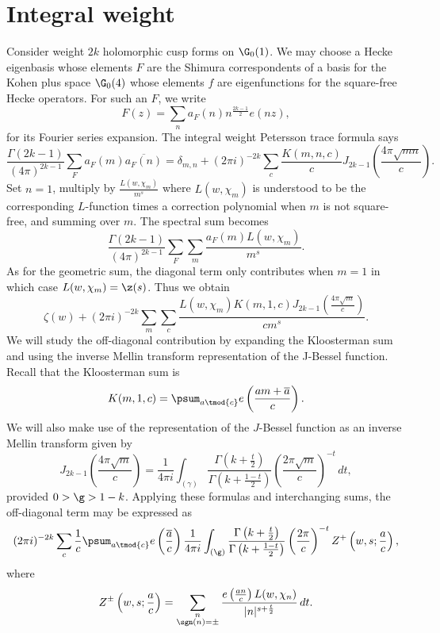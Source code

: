 \documentclass[12pt]{article}
\begin{document}
\section{Integral weight}
    Consider weight \(2k\) holomorphic cusp forms on \(\G_{0}(1)\). We may choose a Hecke eigenbasis whose elements \(F\) are the Shimura correspondents of a basis for the Kohen plus space \(\G_{0}(4)\) whose elements \(f\) are eigenfunctions for the square-free Hecke operators. For such an \(F\), we write
    \[
      F(z) = \sum_{n}a_{F}(n)n^{\frac{2k-1}{2}}e(nz),
    \]
    for its Fourier series expansion. The integral weight Petersson trace formula says
    \[
      \frac{\Gamma(2k-1)}{(4\pi)^{2k-1}}\sum_{F}a_{F}(m)\overline{a_{F}(n)}=\delta_{m,n}+(2\pi i)^{-2k}\sum_{c}\frac{K(m,n,c)}{c}J_{2k-1}\left(\frac{4\pi \sqrt{mn}}{c}\right).
    \]
    Set \(n = 1\), multiply by \(\frac{L(w,\chi_{m})}{m^s}\) where \(L(w,\chi_{m})\) is understood to be the corresponding \(L\)-function times a correction polynomial when \(m\) is not square-free, and summing over \(m\). The spectral sum becomes
    \[
      \frac{\Gamma(2k-1)}{(4\pi)^{2k-1}}\sum_{F}\sum_{m}\frac{a_{F}(m)L(w,\chi_{m})}{m^{s}}.
    \]
    As for the geometric sum, the diagonal term only contributes when \(m = 1\) in which case \(L(w,\chi_{m}) = \z(s)\). Thus we obtain
    \[
      \zeta(w)+(2\pi i)^{-2k}\sum_{m}\sum_{c}\frac{L(w,\chi_{m})K(m,1,c)J_{2k-1}\left(\frac{4\pi\sqrt{m}}{c}\right)}{cm^s}.
    \]
    We will study the off-diagonal contribution by expanding the Kloosterman sum and using the inverse Mellin transform representation of the J-Bessel function. Recall that the Kloosterman sum is
    \[
      K(m,1,c)=\psum_{a \tmod{c}}e\left(\frac{am+\overline{a}}{c}\right).
    \]
    We will also make use of the representation of the \(J\)-Bessel function as an inverse Mellin transform given by
    \[
      J_{2k - 1}\left(\frac{4\pi\sqrt{m}}{c}\right)=\frac{1}{4\pi i}\int_{(\gamma)}\frac{\Gamma\left(k+\frac{t}{2}\right)}{\Gamma\left(k+\frac{1-t}{2}\right)}\left(\frac{2\pi\sqrt{m}}{c}\right)^{-t}\,dt,
    \]
    provided \(0 > \g > 1-k\). Applying these formulas and interchanging sums, the off-diagonal term may be expressed as
    \[
      (2\pi i)^{-2k}\sum_{c}\frac{1}{c}\psum_{a \tmod{c}}e\left(\frac{\overline{a}}{c}\right)\frac{1}{4\pi i}\int_{(\g)}\frac{\Gamma\left(k+\frac{t}{2}\right)}{\Gamma\left(k+\frac{1-t}{2}\right)}\left(\frac{2\pi}{c}\right)^{-t}Z^{+}\left(w,s;\frac{a}{c}\right),
    \]
    where
    \[
      Z^{\pm}\left(w,s;\frac{a}{c}\right) = \sum_{\substack{n \\ \sgn(n) = \pm}}\frac{e\left(\frac{an}{c}\right)L(w,\chi_{n})}{|n|^{s+\frac{t}{2}}}\,dt.
    \]
\end{document}
